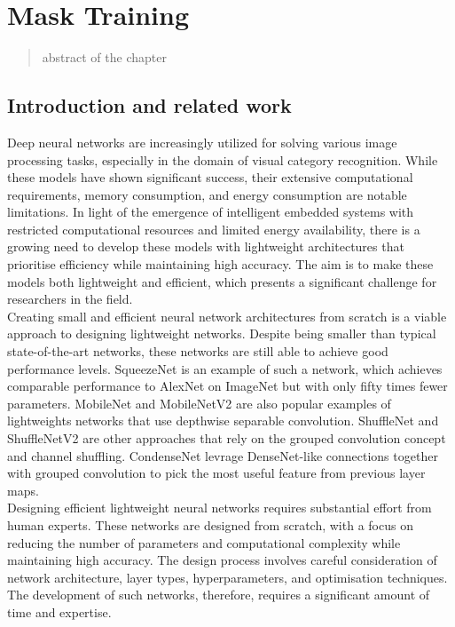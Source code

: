 \chapter{Mask Training}
\label{chap:chapter2}


\localtableofcontents


\begin{abstract}
    abstract of the chapter
\end{abstract}

\section{Introduction and related work}
Deep neural networks are increasingly utilized for solving various image
processing tasks, especially in the domain of visual category recognition.
While these models have shown significant success, their extensive computational
requirements, memory consumption, and energy consumption are notable
limitations. In light of the emergence of intelligent embedded systems with
restricted computational resources and limited energy availability, there is a
growing need to develop these models with lightweight architectures that
prioritise efficiency while maintaining high accuracy. The aim is to make these
models both lightweight and efficient, which presents a significant challenge for
researchers in the field.\\

Creating small and efficient neural network architectures from scratch is a
viable approach to designing lightweight networks. Despite being smaller than
typical state-of-the-art networks, these networks are still able to achieve good
performance levels. SqueezeNet \cite{DBLP:journals/corr/IandolaMAHDK16} is an
example of such a network, which achieves comparable performance to AlexNet on
ImageNet but with only fifty times fewer parameters.  MobileNet
\cite{howard2017mobilenets} and MobileNetV2 \cite{DongMobileNetV2} are also
popular examples of lightweights networks that use depthwise separable
convolution. ShuffleNet \cite{ZhangShuffleNet} and ShuffleNetV2
\cite{MaShuffleNetV2} are other approaches that rely on the grouped convolution
concept and channel shuffling. CondenseNet \cite{huang2018condensenet} levrage
DenseNet-like \cite{huang2017densely} connections together with grouped
convolution to pick the most useful feature from previous layer maps.\\

Designing efficient lightweight neural networks requires substantial effort from
human experts. These networks are designed from scratch, with a focus on
reducing the number of parameters and computational complexity while maintaining
high accuracy. The design process involves careful consideration of network
architecture, layer types, hyperparameters, and optimisation techniques. The
development of such networks, therefore, requires a significant amount of time
and expertise.\\

